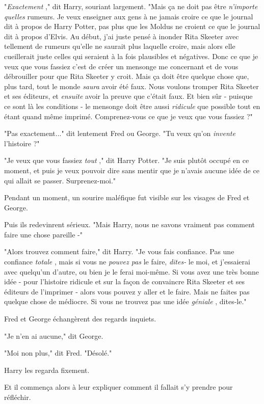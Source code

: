 "\emph{Exactement} ," dit Harry, souriant largement. "Mais ça ne doit pas être \emph{n'importe quelles } rumeurs. Je veux enseigner aux gens à ne jamais croire ce que le journal dit à propos de Harry Potter, pas plus que les Moldus ne croient ce que le journal dit à propos d'Elvis. Au début, j'ai juste pensé à inonder Rita Skeeter avec tellement de rumeurs qu'elle ne saurait plus laquelle croire, mais alors elle cueillerait juste celles qui seraient à la fois plausibles et négatives. Donc ce que je veux que vous fassiez c'est de créer un mensonge me concernant et de vous débrouiller pour que Rita Skeeter y croit. Mais ça doit être quelque chose que, plus tard, tout le monde \emph{saura}  avoir été faux. Nous voulons tromper Rita Skeeter et ses éditeurs, et \emph{ensuite}  avoir la preuve que c'était faux. Et bien sûr - puisque ce sont là les conditions - le mensonge doit être aussi \emph{ridicule} que possible tout en étant quand même imprimé. Comprenez-vous ce que je veux que vous fassiez ?"

"Pas exactement..." dit lentement Fred ou George. "Tu veux qu'on \emph{invente} l'histoire ?"

"Je veux que vous fassiez \emph{tout} ," dit Harry Potter. "Je suis plutôt occupé en ce moment, et puis je veux pouvoir dire sans mentir que je n'avais aucune idée de ce qui allait se passer. Surprenez-moi."

Pendant un moment, un sourire maléfique fut visible sur les visages de Fred et George.

Puis ils redevinrent sérieux. "Mais Harry, nous ne savons vraiment pas comment faire une chose pareille -"

"Alors trouvez comment faire," dit Harry. "Je vous fais confiance. Pas une confiance \emph{totale} , mais si vous ne \emph{pouvez pas}  le faire, \emph{dites-} le moi, et j'essaierai avec quelqu'un d'autre, ou bien je le ferai moi-même. Si vous avez une très bonne idée - pour l'histoire ridicule et sur la façon de convaincre Rita Skeeter et ses éditeurs de l'imprimer - alors vous pouvez y aller et le faire. Mais ne faites pas quelque chose de médiocre. Si vous ne trouvez pas une idée \emph{géniale} , dites-le."

Fred et George échangèrent des regards inquiets.

"Je n'en ai aucune," dit George.

"Moi non plus," dit Fred. "Désolé."

Harry les regarda fixement.

Et il commença alors à leur expliquer comment il fallait s'y prendre pour réfléchir.

